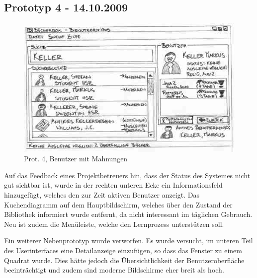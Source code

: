 \documentclass[10pt, a4paper]{scrartcl}
\begin{document}
\subsection{Prototyp 4 - 14.10.2009} 
\begin{figure}
  \begin{center}
   \includegraphics{prototyp4Thumbnail} \\
   Prot. 4, Benutzer mit Mahnungen
  \end{center}
\end{figure}
Auf das Feedback eines Projektbetreuers hin, dass der Status des Systemes nicht gut sichtbar ist, wurde in der rechten unteren Ecke ein Informationsfeld hinzugefügt, welches den zur Zeit aktiven Benutzer anzeigt. Das Kuchendiagramm auf dem Hauptbildschirm, welches über den Zustand der Bibliothek informiert wurde entfernt, da nicht interessant im täglichen Gebrauch. Neu ist zudem die Menüleiste, welche den Lernprozess unterstützen soll.

Ein weiterer Nebenprototyp wurde verworfen. Es wurde versucht, im unteren Teil des Userinterfaces eine Detailanzeige einzufügen, so dass das Fenster zu einem Quadrat wurde. Dies hätte jedoch die Übersichtlichkeit der Benutzeroberfläche beeinträchtigt und zudem sind moderne Bildschirme eher breit als hoch.
\end{document}
